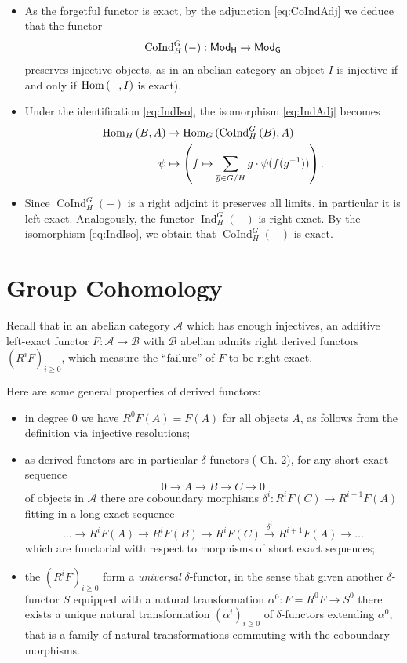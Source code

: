 \documentclass[a4paper, oneside]{memoir}
\begin{document}
\begin{remark}\label{rm:Adj}\
	\begin{itemize}
		\item[(a)] As the forgetful functor is exact, by the adjunction \eqref{eq:CoIndAdj} we deduce that the functor
		      \[
			      \operatorname{CoInd}^G_H{(-)}:\mathsf{Mod}_\mathsf{H}\to\mathsf{Mod}_\mathsf{G}
		      \]
		      preserves injective objects, as in an abelian category an object $I$ is injective if and only if $\operatorname{Hom}{(-,I)}$ is exact).
		\item[(b)] Under the identification \eqref{eq:IndIso}, the isomorphism \eqref{eq:IndAdj} becomes
		      \begin{align*}
			      \operatorname{Hom}_H{(B,A)} & \to \operatorname{Hom}_G{(\operatorname{CoInd}^G_H{(B)},A)}                                        \\
			      \psi          & \mapsto \left(f\mapsto \sum_{\overline{g} \in G / H}{g\cdot \psi(f(g^{-1}))}\right).
		      \end{align*}
		\item[(c)] Since $\operatorname{CoInd}^G_H{(-)}$ is a right adjoint it preserves all limits, in particular it is left-exact. Analogously, the functor $\operatorname{Ind}^G_H{(-)}$ is right-exact. By the isomorphism \eqref{eq:IndIso}, we obtain that $\operatorname{CoInd}^G_H{(-)}$ is exact.
	\end{itemize}
\end{remark}

\section{Group Cohomology}

Recall that in an abelian category $\mathcal{A}$ which has enough injectives, an additive left-exact functor $F:\mathcal{A}\to\mathcal{B}$ with $\mathcal{B}$ abelian admits right derived functors $(R^i F)_{i\geq 0}$, which measure the ``failure'' of $F$ to be right-exact.

\medskip \noindent Here are some general properties of derived functors:
\begin{itemize}
	\item in degree $0$ we have $R^0F(A)=F(A)$ for all objects $A$, as follows from the definition via injective resolutions;
	\item as derived functors are in particular $\delta$-functors (\cite{Weibel} Ch. 2), for any short exact sequence
	      \[
		      0\to A\to B\to C\to 0
	      \]
	      of objects in $\mathcal{A}$ there are coboundary morphisms $\delta^i:R^iF(C)\to R^{i+1}F(A)$ fitting in a long exact sequence
	      \[
		      \ldots\to R^iF(A)\to R^iF(B)\to R^iF(C)\overset{\delta^i}{\to} R^{i+1}F(A)\to\ldots
	      \]
	      which are functorial with respect to morphisms of short exact sequences;
	\item the $(R^i F)_{i \geq 0}$ form a \textit{universal} $\delta$-functor, in the sense that given another $\delta$-functor $S$ equipped with a natural transformation $\alpha^0:F=R^0F\to S^0$ there exists a unique natural transformation $(\alpha^i)_{i\geq 0}$ of $\delta$-functors extending $\alpha^0$, that is a family of natural transformations commuting with the coboundary morphisms.
\end{itemize}
\end{document}
